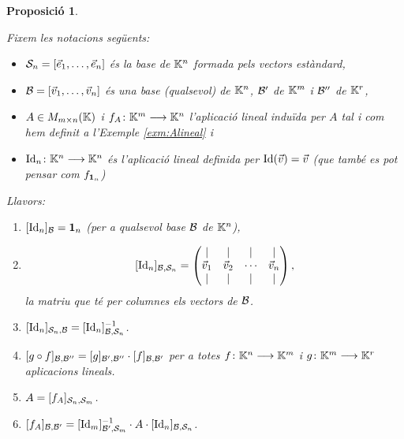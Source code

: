 \documentclass[
  11pt,
]{book}
\numberwithin{dummy}{section}
\theoremstyle{maincolornumbox}
\theoremstyle{blacknumex}
\theoremstyle{blacknumbox}
\theoremstyle{maincolornum}
\newtheorem{propositionT}{Proposició}[chapter]
\newenvironment{proposition}{\begin{pBox}\begin{propositionT}}{\end{propositionT}\end{pBox}}
\begin{document}
\begin{proposition}
\protect\hypertarget{prp:canvibase}{}\label{prp:canvibase}

Fixem les notacions següents:

\begin{itemize}
\item
  \(\mathcal{S}_n=[\vec e_1, \dots, \vec e_n]\) és la base de \(\mathbb{K}^n\) formada
  pels vectors estàndard,
\item
  \(\mathcal{B}=[\vec v_1, \dots,\vec v_n]\) és una base (qualsevol) de
  \(\mathbb{K}^n\), \(\mathcal{B}'\) de \(\mathbb{K}^m\) i \(\mathcal{B}''\) de \(\mathbb{K}^r\),
\item
  \(A\in M_{m\times n}(\mathbb{K})\) i \(f_A\colon \mathbb{K}^m\longrightarrow \mathbb{K}^n\) l'aplicació
  lineal induïda per \(A\) tal i com hem definit a l'Exemple
  \ref{exm:Alineal} i
\item
  \(\operatorname{Id}_n\colon\mathbb{K}^n \longrightarrow \mathbb{K}^n\) és l'aplicació lineal definida per
  \(\operatorname{Id}(\vec v)=\vec v\) (que també es pot pensar com \(f_{\mathbf{1}_n}\))
\end{itemize}

Llavors:

\begin{enumerate}
\def\labelenumi{\alph{enumi}.}
\item
  \([\operatorname{Id}_n]_{\mathcal{B}}=\mathbf{1}_n\) (per a qualsevol base \(\mathcal{B}\) de \(\mathbb{K}^n\)),
\item
  \[[\operatorname{Id}_n]_{\mathcal{B},\mathcal{S}_n}=  \begin{pmatrix}
              \mid & \mid &\mid & \mid\\
              \vec v_1 & \vec v_2 &\cdots&\vec v_n\\
              \mid & \mid &\mid & \mid
              \end{pmatrix},\] la matriu que té per columnes els vectors
  de \(\mathcal{B}\).
\item
  \([\operatorname{Id}_n]_{\mathcal{S}_n,\mathcal{B}}=[\operatorname{Id}_n]_{\mathcal{B},\mathcal{S}_n}^{-1}\).
\item
  \([g\circ f]_{\mathcal{B},\mathcal{B}''}=[g]_{\mathcal{B}',\mathcal{B}''}\cdot[f]_{\mathcal{B},\mathcal{B}'}\)
  per a totes \(f\colon \mathbb{K}^n\longrightarrow \mathbb{K}^m\) i \(g\colon \mathbb{K}^m\longrightarrow\mathbb{K}^r\)
  aplicacions lineals.
\item
  \(A=[f_A]_{\mathcal{S}_n,\mathcal{S}_m}\).
\item
  \([f_A]_{\mathcal{B},\mathcal{B}'}= [\operatorname{Id}_m]_{\mathcal{B}',\mathcal{S}_m}^{-1} \cdot A \cdot [\operatorname{Id}_n]_{\mathcal{B},\mathcal{S}_n}\).
\end{enumerate}

\end{proposition}
\end{document}
